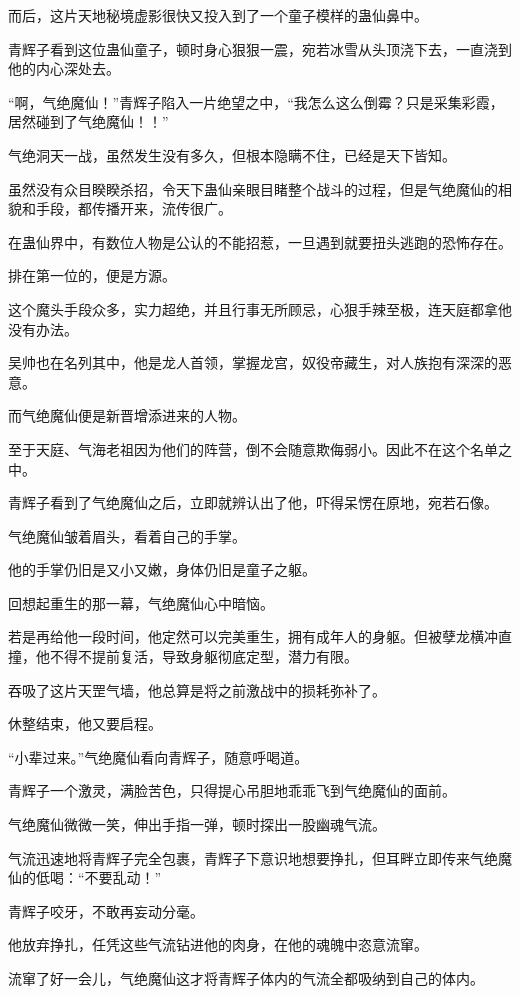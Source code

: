 \begin{this_body}
而后，这片天地秘境虚影很快又投入到了一个童子模样的蛊仙鼻中。

青辉子看到这位蛊仙童子，顿时身心狠狠一震，宛若冰雪从头顶浇下去，一直浇到他的内心深处去。

“啊，气绝魔仙！”青辉子陷入一片绝望之中，“我怎么这么倒霉？只是采集彩霞，居然碰到了气绝魔仙！！”

气绝洞天一战，虽然发生没有多久，但根本隐瞒不住，已经是天下皆知。

虽然没有众目睽睽杀招，令天下蛊仙亲眼目睹整个战斗的过程，但是气绝魔仙的相貌和手段，都传播开来，流传很广。

在蛊仙界中，有数位人物是公认的不能招惹，一旦遇到就要扭头逃跑的恐怖存在。

排在第一位的，便是方源。

这个魔头手段众多，实力超绝，并且行事无所顾忌，心狠手辣至极，连天庭都拿他没有办法。

吴帅也在名列其中，他是龙人首领，掌握龙宫，奴役帝藏生，对人族抱有深深的恶意。

而气绝魔仙便是新晋增添进来的人物。

至于天庭、气海老祖因为他们的阵营，倒不会随意欺侮弱小。因此不在这个名单之中。

青辉子看到了气绝魔仙之后，立即就辨认出了他，吓得呆愣在原地，宛若石像。

气绝魔仙皱着眉头，看着自己的手掌。

他的手掌仍旧是又小又嫩，身体仍旧是童子之躯。

回想起重生的那一幕，气绝魔仙心中暗恼。

若是再给他一段时间，他定然可以完美重生，拥有成年人的身躯。但被孽龙横冲直撞，他不得不提前复活，导致身躯彻底定型，潜力有限。

吞吸了这片天罡气墙，他总算是将之前激战中的损耗弥补了。

休整结束，他又要启程。

“小辈过来。”气绝魔仙看向青辉子，随意呼喝道。

青辉子一个激灵，满脸苦色，只得提心吊胆地乖乖飞到气绝魔仙的面前。

气绝魔仙微微一笑，伸出手指一弹，顿时探出一股幽魂气流。

气流迅速地将青辉子完全包裹，青辉子下意识地想要挣扎，但耳畔立即传来气绝魔仙的低喝：“不要乱动！”

青辉子咬牙，不敢再妄动分毫。

他放弃挣扎，任凭这些气流钻进他的肉身，在他的魂魄中恣意流窜。

流窜了好一会儿，气绝魔仙这才将青辉子体内的气流全都吸纳到自己的体内。


\end{this_body}
